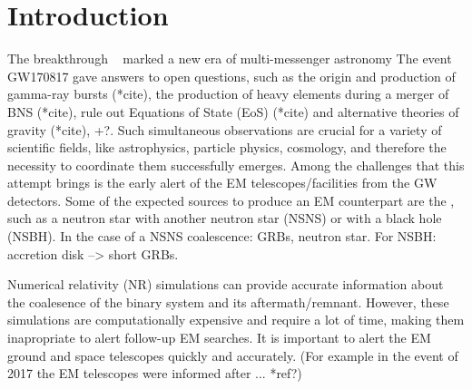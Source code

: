 \section{Introduction}

The breakthrough ~\cite{LIGOScientific:2017ync} marked a new era of multi-messenger astronomy  The event GW170817 gave answers to open questions, such as the origin and production of gamma-ray bursts (*cite), the production of heavy elements during a merger of BNS (*cite), rule out Equations of State (EoS) (*cite) and alternative theories of gravity (*cite), +?. Such simultaneous observations are crucial for a variety of scientific fields, like astrophysics, particle physics, cosmology, and therefore the necessity to coordinate them successfully emerges. Among the challenges that this attempt brings is the early alert of the EM telescopes/facilities from the GW detectors. Some of the expected sources to produce an EM counterpart are the , such as a neutron star with another neutron star (NSNS) or with a black hole (NSBH). In the case of a NSNS coalescence: GRBs, neutron star. For NSBH: accretion disk --> short GRBs. 


Numerical relativity (NR) simulations can provide accurate information about the coalesence of the binary system and its aftermath/remnant. However, these simulations are computationally expensive and require a lot of time, making them inapropriate to alert follow-up EM searches. It is important to alert the EM ground and space telescopes quickly and accurately. (For example in the event of 2017 the EM telescopes were informed after ... *ref?)
   
